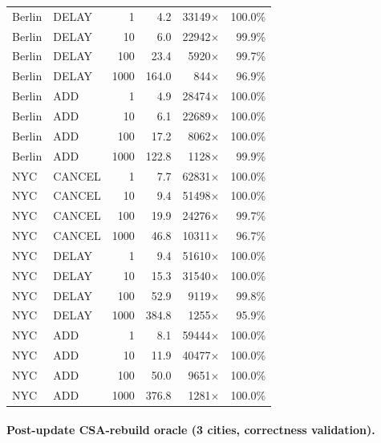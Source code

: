 \documentclass[letterpaper]{article}
\begin{document}
\begin{table}[H]
\begin{tabular}{llrrrr}
Berlin & DELAY  & 1    & 4.2   & 33149$\times$ & 100.0\% \\
Berlin & DELAY  & 10   & 6.0   & 22942$\times$ & 99.9\% \\
Berlin & DELAY  & 100  & 23.4  & 5920$\times$  & 99.7\% \\
Berlin & DELAY  & 1000 & 164.0 & 844$\times$   & 96.9\% \\
Berlin & ADD    & 1    & 4.9   & 28474$\times$ & 100.0\% \\
Berlin & ADD    & 10   & 6.1   & 22689$\times$ & 100.0\% \\
Berlin & ADD    & 100  & 17.2  & 8062$\times$  & 100.0\% \\
Berlin & ADD    & 1000 & 122.8 & 1128$\times$  & 99.9\% \\
NYC    & CANCEL & 1    & 7.7   & 62831$\times$ & 100.0\% \\
NYC    & CANCEL & 10   & 9.4   & 51498$\times$ & 100.0\% \\
NYC    & CANCEL & 100  & 19.9  & 24276$\times$ & 99.7\% \\
NYC    & CANCEL & 1000 & 46.8  & 10311$\times$ & 96.7\% \\
NYC    & DELAY  & 1    & 9.4   & 51610$\times$ & 100.0\% \\
NYC    & DELAY  & 10   & 15.3  & 31540$\times$ & 100.0\% \\
NYC    & DELAY  & 100  & 52.9  & 9119$\times$  & 99.8\% \\
NYC    & DELAY  & 1000 & 384.8 & 1255$\times$  & 95.9\% \\
NYC    & ADD    & 1    & 8.1   & 59444$\times$ & 100.0\% \\
NYC    & ADD    & 10   & 11.9  & 40477$\times$ & 100.0\% \\
NYC    & ADD    & 100  & 50.0  & 9651$\times$  & 100.0\% \\
NYC    & ADD    & 1000 & 376.8 & 1281$\times$  & 100.0\% \\
\bottomrule
\end{tabular}
\end{table}

\paragraph{Post-update CSA-rebuild oracle (3 cities, correctness validation).}
\end{document}
